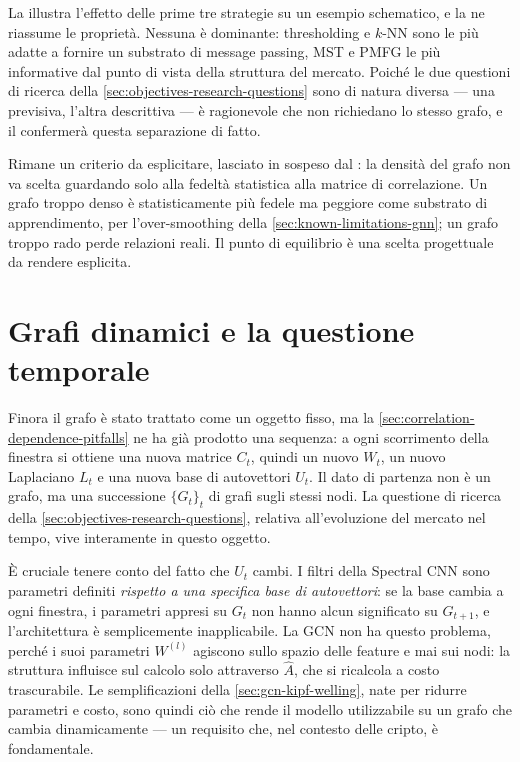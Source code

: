 La  illustra l'effetto delle prime tre strategie su un esempio schematico, e la  ne riassume le proprietà. Nessuna è dominante: thresholding e $k$-NN sono le più adatte a fornire un substrato di message passing, MST e PMFG le più informative dal punto di vista della struttura del mercato. Poiché le due questioni di ricerca della \cref{sec:objectives-research-questions} sono di natura diversa — una previsiva, l'altra descrittiva — è ragionevole che non richiedano lo stesso grafo, e il  confermerà questa separazione di fatto.

Rimane un criterio da esplicitare, lasciato in sospeso dal : la densità del grafo non va scelta guardando solo alla fedeltà statistica alla matrice di correlazione. Un grafo troppo denso è statisticamente più fedele ma peggiore come substrato di apprendimento, per l'over-smoothing della \cref{sec:known-limitations-gnn}; un grafo troppo rado perde relazioni reali. Il punto di equilibrio è una scelta progettuale da rendere esplicita.

\section{Grafi dinamici e la questione temporale}
\label{sec:dynamic-graphs-temporal-question}

Finora il grafo è stato trattato come un oggetto fisso, ma la \cref{sec:correlation-dependence-pitfalls} ne ha già prodotto una sequenza: a ogni scorrimento della finestra si ottiene una nuova matrice $C_t$, quindi un nuovo $W_t$, un nuovo Laplaciano $L_t$ e una nuova base di autovettori $U_t$. Il dato di partenza non è un grafo, ma una successione $\{G_t\}_{t}$ di grafi sugli stessi nodi. La questione di ricerca della \cref{sec:objectives-research-questions}, relativa all'evoluzione del mercato nel tempo, vive interamente in questo oggetto.

È cruciale tenere conto del fatto che $U_t$ cambi. I filtri della Spectral CNN sono parametri definiti \emph{rispetto a una specifica base di autovettori}: se la base cambia a ogni finestra, i parametri appresi su $G_t$ non hanno alcun significato su $G_{t+1}$, e l'architettura è semplicemente inapplicabile. La GCN non ha questo problema, perché i suoi parametri $W^{(l)}$ agiscono sullo spazio delle feature e mai sui nodi: la struttura influisce sul calcolo solo attraverso $\hat A$, che si ricalcola a costo trascurabile. Le semplificazioni della \cref{sec:gcn-kipf-welling}, nate per ridurre parametri e costo, sono quindi ciò che rende il modello utilizzabile su un grafo che cambia dinamicamente — un requisito che, nel contesto delle cripto, è fondamentale.

